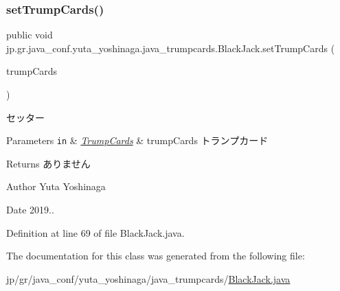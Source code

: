 \subsubsection{\texorpdfstring{set\+Trump\+Cards()}{setTrumpCards()}}
{\footnotesize\ttfamily public void jp.\+gr.\+java\+\_\+conf.\+yuta\+\_\+yoshinaga.\+java\+\_\+trumpcards.\+Black\+Jack.\+set\+Trump\+Cards (\begin{DoxyParamCaption}\item[{\hyperlink{classjp_1_1gr_1_1java__conf_1_1yuta__yoshinaga_1_1java__trumpcards_1_1_trump_cards}{Trump\+Cards}}]{trump\+Cards }\end{DoxyParamCaption})}



セッター 


\begin{DoxyParams}[1]{Parameters}
\mbox{\tt in}  & {\em \hyperlink{classjp_1_1gr_1_1java__conf_1_1yuta__yoshinaga_1_1java__trumpcards_1_1_trump_cards}{Trump\+Cards}} & trump\+Cards トランプカード \\
\hline
\end{DoxyParams}
\begin{DoxyReturn}{Returns}
ありません 
\end{DoxyReturn}
\begin{DoxyAuthor}{Author}
Yuta Yoshinaga 
\end{DoxyAuthor}
\begin{DoxyDate}{Date}
2019.. 
\end{DoxyDate}


Definition at line 69 of file Black\+Jack.\+java.



The documentation for this class was generated from the following file\+:\begin{DoxyCompactItemize}
\item 
jp/gr/java\+\_\+conf/yuta\+\_\+yoshinaga/java\+\_\+trumpcards/\hyperlink{_black_jack_8java}{Black\+Jack.\+java}\end{DoxyCompactItemize}
